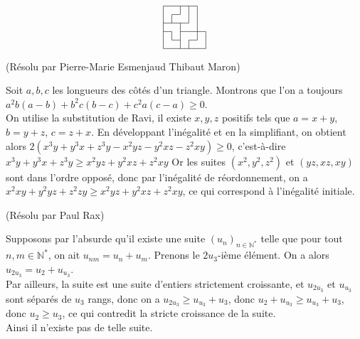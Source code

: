 \begin{sol}[34]
\[\begin{tikzpicture}[scale=0.3]
\draw (0, 0)--(0,5 );
\draw (1, 1)--(1,2 );
\draw (1, 3)--(1,4 );
\draw (2, 0)--(2,3 );
\draw (2, 4)--(2,5 );
\draw (3, 0)--(3,1 );
\draw (3, 3)--(3,5 );
\draw (4, 1)--(4,5 );
\draw (5, 0)--(5,2 );

\draw(0,0)--(5,0);
\draw(1,1)--(2,1);
\draw(3,1)--(4,1);
\draw(0,2)--(1,2);
\draw(2,2)--(5,2);
\draw(0,3)--(3,3);
\draw(1,4)--(2,4);
\draw(0,5)--(4,5);
\end{tikzpicture}\]

\end{sol}


\begin{sol}[130](Résolu par Pierre-Marie Esmenjaud Thibaut Maron)

Soit $a,b,c$ les longueurs des côtés d'un triangle. Montrons que l'on a toujours $a^2b(a-b)+b^2c(b-c)+c^2a(c-a) \geq 0$.\\
On utilise la substitution de Ravi, il existe $x,y,z$ positifs tels que 
$a=x+y$,$b=y+z$, $c=z+x$.
En développant l'inégalité et en la simplifiant, on obtient alors
$2(x^3y+y^3x+z^3y-x^2yz-y^2xz-z^2xy) \geq 0$,
c'est-\`a-dire $x^3y+y^3x+z^3y \geq x^2yz+y^2xz+z^2xy$
Or les suites $(x^2,y^2,z^2)$ et $(yz,xz,xy)$ sont dans l'ordre opposé, donc par l'in\'egalit\'e de r\'eordonnement,
on a $x^2xy+y^2yz+z^2zy \geq x^2yz+y^2xz+z^2xy$, ce qui correspond \`a l'in\'egalit\'e initiale.

\end{sol}

\begin{sol}[130](Résolu par Paul Rax)

Supposons par l'absurde qu'il existe une suite $(u_n)_{n \in \mathbb{N}^*}$ telle que pour tout $n,m \in \mathbb{N}^*$, on ait
$u_{nm}=u_n+u_m$. Prenons le $2u_3$-i\`eme \'el\'ement. On a alors $u_{2u_3}=u_2+u_{u_3}$.\\
Par ailleurs, la suite est une suite d'entiers strictement croissante, et $u_{2u_3}$ et $u_{u_3}$ sont s\'epar\'es de $u_3$ rangs,
donc on a $u_{2u_3} \geq u_{u_3} +u_3$, donc $u_2+u_{u_3} \geq u_{u_3} +u_3$, donc $u_2 \geq u_3$, ce qui contredit la stricte croissance de la suite.\\
Ainsi il n'existe pas de telle suite.

\end{sol}



